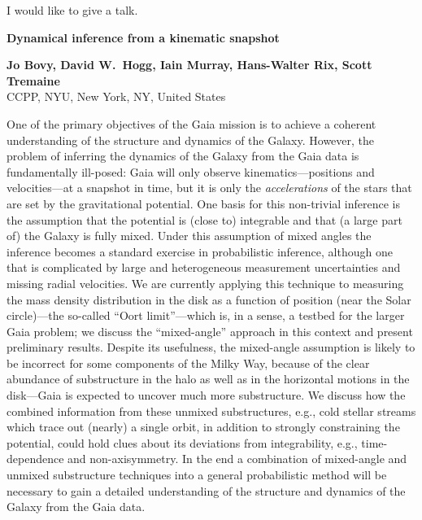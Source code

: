 \documentclass[]{article}
\begin{document}


I would like to give a talk.
\bigskip

\begin{center} 

{\Large \bf  {Dynamical inference from a kinematic snapshot}}

\end{center}

\begin{center}
{\large \bf   
Jo Bovy, David W.~Hogg, Iain Murray, Hans-Walter Rix, Scott Tremaine
}\\

{\small
CCPP, NYU, New York, NY, United States
}\\
\end{center}

One of the primary objectives of the Gaia mission is to achieve a
coherent understanding of the structure and dynamics of the
Galaxy. However, the problem of inferring the dynamics of the Galaxy
from the Gaia data is fundamentally ill-posed: Gaia will only observe
kinematics---positions and velocities---at a snapshot in time, but it
is only the \emph{accelerations} of the stars that are set by the
gravitational potential. One basis for this non-trivial inference is
the assumption that the potential is (close to) integrable and that (a
large part of) the Galaxy is fully mixed. Under this assumption of
mixed angles the inference becomes a standard exercise in
probabilistic inference, although one that is complicated by large and
heterogeneous measurement uncertainties and missing radial
velocities. We are currently applying this technique to measuring the
mass density distribution in the disk as a function of position (near
the Solar circle)---the so-called ``Oort limit''---which is, in a
sense, a testbed for the larger Gaia problem; we discuss the
``mixed-angle'' approach in this context and present preliminary
results. Despite its usefulness, the mixed-angle assumption is likely
to be incorrect for some components of the Milky Way, because of the
clear abundance of substructure in the halo as well as in the
horizontal motions in the disk---Gaia is expected to uncover much more
substructure. We discuss how the combined information from these
unmixed substructures, e.g., cold stellar streams which trace out
(nearly) a single orbit, in addition to strongly constraining the
potential, could hold clues about its deviations from integrability,
e.g., time-dependence and non-axisymmetry. In the end a combination of
mixed-angle and unmixed substructure techniques into a general
probabilistic method will be necessary to gain a detailed
understanding of the structure and dynamics of the Galaxy from the
Gaia data.


\bigskip
\bigskip

\end{document}
